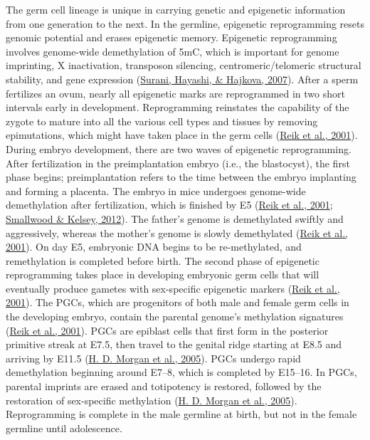 \documentclass[12pt,twoside]{reedthesis}
\begin{document}
The germ cell lineage is unique in carrying genetic and epigenetic
information from one generation to the next. In the germline, epigenetic
reprogramming resets genomic potential and erases epigenetic memory.
Epigenetic reprogramming involves genome-wide demethylation of 5mC,
which is important for genome imprinting, X inactivation, transposon
silencing, centromeric/telomeric structural stability, and gene
expression (\protect\hyperlink{ref-surani2007}{Surani, Hayashi, \& Hajkova, 2007}). After a sperm fertilizes an ovum, nearly all
epigenetic marks are reprogrammed in two short intervals early in
development. Reprogramming reinstates the capability of the zygote to
mature into all the various cell types and tissues by removing
epimutations, which might have taken place in the germ cells
(\protect\hyperlink{ref-reik2001}{Reik et al., 2001}). During embryo development, there are two waves of
epigenetic reprogramming. After fertilization in
the preimplantation embryo (i.e., the blastocyst), the first phase
begins; preimplantation refers to the time between the embryo implanting
and forming a placenta. The embryo in mice undergoes genome-wide
demethylation after fertilization, which is finished by E5 (\protect\hyperlink{ref-reik2001}{Reik et al., 2001}; \protect\hyperlink{ref-smallwood2012}{Smallwood \& Kelsey, 2012}). The father's genome is demethylated swiftly and
aggressively, whereas the mother's genome is slowly demethylated
(\protect\hyperlink{ref-reik2001}{Reik et al., 2001}). On day E5, embryonic DNA begins to be re-methylated, and
remethylation is completed before birth. The second phase of epigenetic
reprogramming takes place in developing embryonic germ cells that will
eventually produce gametes with sex-specific epigenetic markers
(\protect\hyperlink{ref-reik2001}{Reik et al., 2001}). The PGCs, which are progenitors of both male and female
germ cells in the developing embryo, contain the parental genome's
methylation signatures (\protect\hyperlink{ref-reik2001}{Reik et al., 2001}). PGCs are epiblast cells that first
form in the posterior primitive streak at E7.5, then travel to the
genital ridge starting at E8.5 and arriving by E11.5 (\protect\hyperlink{ref-morgan2005}{H. D. Morgan et al., 2005}). PGCs
undergo rapid demethylation beginning around E7--8, which is completed
by E15--16. In PGCs, parental imprints are erased and totipotency is
restored, followed by the restoration of sex-specific methylation
(\protect\hyperlink{ref-morgan2005}{H. D. Morgan et al., 2005}). Reprogramming is complete in the male germline at birth,
but not in the female germline until adolescence.
\end{document}
